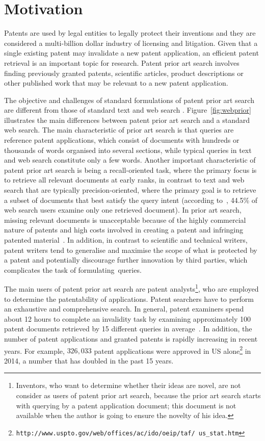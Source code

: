 \section{Motivation}
\label{sec:Motivation}
Patents are used by legal entities to legally protect their inventions and they are considered a multi-billion dollar industry of licensing and litigation. Given that a single existing patent may invalidate a new patent application, an efficient patent retrieval is an important topic for research. 
Patent prior art search involves finding previously granted patents, scientific articles, product
descriptions or other published work that may be relevant to a new patent application. 

The objective and challenges of standard formulations of patent prior art
search are different from those of standard text and web search \citep{magdy2012toward}.
Figure~\ref{fig:webprior} illustrates the main differences between 
patent prior art search and a standard web search.
The main characteristic of prior art search is that queries are reference patent
applications, which consist of documents with hundreds or thousands of
words organised into several sections, while typical queries in text
and web search constitute only a few words. 
Another important characteristic of patent prior art
search is being a recall-oriented task, where the primary focus is to
retrieve all relevant documents at early ranks, in contrast to text
and web search that are typically precision-oriented, where the primary goal is
to retrieve a subset of documents that best satisfy the query
intent (according to~\citep{zhang2010search}, 44.5\% of web search users examine only one retrieved document). 
In prior art search, missing relevant documents is unacceptable because of the highly commercial nature of patents and high costs involved
in creating a patent and infringing patented material~\citep{joho2010survey}. 
In addition, in contrast to scientific and technical writers, patent writers
tend to generalise and maximise the scope of what is protected by a
patent and potentially discourage further innovation by third parties,
which complicates the task of formulating~queries. 

The main users of patent prior art search are 
patent analysts\footnote{Inventors, who want to determine whether their ideas are novel, 
are not consider as users of patent prior art search, because the prior art search starts with querying by a patent application document; this document is not available when  the author is going to ensure the novelty of his idea.}, 
who are employed to determine the patentability 
of applications. 
Patent searchers have to perform an exhaustive and comprehensive search. In general, patent
examiners spend about 12 hours to complete an invalidity task by examining
approximately 100 patent documents retrieved by 15 different queries in average~\citep{joho2010survey}. 
In addition, the number of patent applications and granted patents is rapidly increasing in recent years. For example, $326,033$ patent applications were approved in US alone\footnote{\texttt{http://www.uspto.gov/web/offices/ac/ido/oeip/taf/ us\_stat.htm}} in 2014, a number that has doubled in the past 15 years.

